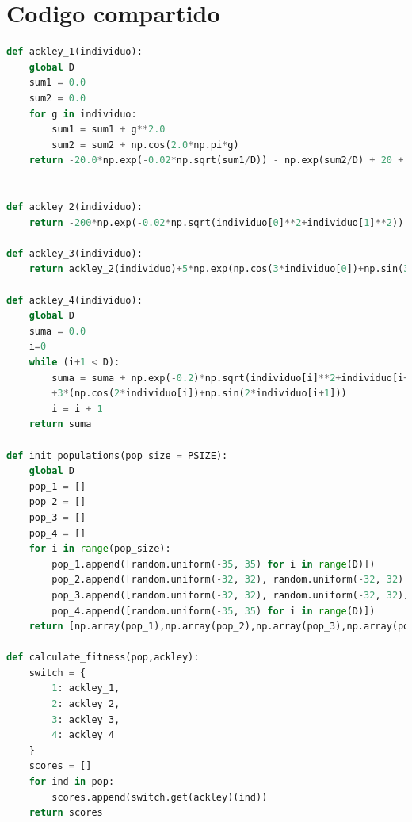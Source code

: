 \documentclass[10pt]{article}
\begin{document}
\section*{Codigo compartido}
\begin{lstlisting}[language=Python]
def ackley_1(individuo):
    global D
    sum1 = 0.0
    sum2 = 0.0
    for g in individuo:
        sum1 = sum1 + g**2.0
        sum2 = sum2 + np.cos(2.0*np.pi*g)
    return -20.0*np.exp(-0.02*np.sqrt(sum1/D)) - np.exp(sum2/D) + 20 + np.e


def ackley_2(individuo):
    return -200*np.exp(-0.02*np.sqrt(individuo[0]**2+individuo[1]**2))

def ackley_3(individuo):
    return ackley_2(individuo)+5*np.exp(np.cos(3*individuo[0])+np.sin(3*individuo[1]))

def ackley_4(individuo):
    global D
    suma = 0.0
    i=0
    while (i+1 < D):
        suma = suma + np.exp(-0.2)*np.sqrt(individuo[i]**2+individuo[i+1]**2)
        +3*(np.cos(2*individuo[i])+np.sin(2*individuo[i+1]))
        i = i + 1
    return suma

def init_populations(pop_size = PSIZE):
    global D
    pop_1 = []
    pop_2 = []
    pop_3 = []
    pop_4 = []
    for i in range(pop_size):
        pop_1.append([random.uniform(-35, 35) for i in range(D)])
        pop_2.append([random.uniform(-32, 32), random.uniform(-32, 32)])
        pop_3.append([random.uniform(-32, 32), random.uniform(-32, 32)])
        pop_4.append([random.uniform(-35, 35) for i in range(D)])
    return [np.array(pop_1),np.array(pop_2),np.array(pop_3),np.array(pop_4)]

def calculate_fitness(pop,ackley):
    switch = {
        1: ackley_1,
        2: ackley_2,
        3: ackley_3,
        4: ackley_4
    }
    scores = []
    for ind in pop:
        scores.append(switch.get(ackley)(ind))
    return scores
\end{lstlisting}
\end{document}
